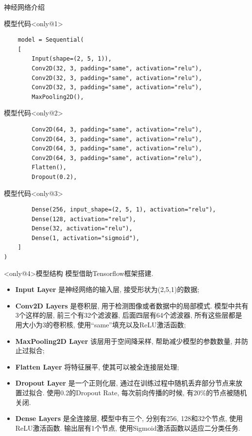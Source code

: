 \documentclass{beamer}
\begin{document}
\begin{frame}[fragile]{神经网络介绍}
	\begin{block}{模型代码}<only@1>
		\begin{verbatim}
    model = Sequential(
    [
        Input(shape=(2, 5, 1)),
        Conv2D(32, 3, padding="same", activation="relu"),
        Conv2D(32, 3, padding="same", activation="relu"),
        Conv2D(32, 3, padding="same", activation="relu"),
        MaxPooling2D(),
		\end{verbatim}
	\end{block}
	\begin{block}{模型代码}<only@2>
		\begin{verbatim}
		Conv2D(64, 3, padding="same", activation="relu"),
		Conv2D(64, 3, padding="same", activation="relu"),
		Conv2D(64, 3, padding="same", activation="relu"),
		Conv2D(64, 3, padding="same", activation="relu"),
		Flatten(),
		Dropout(0.2),
		\end{verbatim}
	\end{block}
	\begin{block}{模型代码}<only@3>
		\begin{verbatim}
        Dense(256, input_shape=(2, 5, 1), activation="relu"),
        Dense(128, activation="relu"),
        Dense(32, activation="relu"),
        Dense(1, activation="sigmoid"),
    ]
)
		\end{verbatim}
	\end{block}

	\begin{block}<only@4>{模型结构}
		模型借助Tensorflow框架搭建.
		\begin{itemize}
			\item \textbf{Input Layer }是神经网络的输入层, 接受形状为(2,5,1)的数据;
			\item \textbf{Conv2D Layers }是卷积层, 用于检测图像或者数据中的局部模式. 模型中共有3个这样的层, 前三个有32个滤波器, 后面四层有64个滤波器, 所有这些层都是用大小为3的卷积核, 使用``same''填充以及ReLU激活函数;
			\item \textbf{MaxPooling2D Layer }该层用于空间降采样, 帮助减少模型的参数数量, 并防止过拟合;
			\item \textbf{Flatten Layer }将特征展平, 使其可以被全连接层处理;
			\item \textbf{Dropout Layer }是一个正则化层, 通过在训练过程中随机丢弃部分节点来放置过拟合. 使用0.2的Dropout Rate, 每次前向传播的时候, 有20\%的节点被随机关闭.
			\item \textbf{Dense Layers }是全连接层, 模型中有三个, 分别有256, 128和32个节点, 使用ReLU激活函数. 输出层有1个节点, 使用Sigmoid激活函数以适应二分类任务.
		\end{itemize}
	\end{block}
\end{frame}
\end{document}
